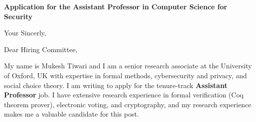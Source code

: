 \documentclass[11pt,a4paper,roman]{moderncv}
\begin{document}
\date{}
\opening{\textbf{Application for the Assistant Professor in Computer Science for Security}}
\closing{Your Sincerly, \vspace{-1em}}



\makelettertitle


Dear Hiring Committee, 
\\
\vspace{1em}

My name is Mukesh Tiwari and I am a senior research associate at 
the University of Oxford, UK with expertise in formal methods, cybersecurity and privacy, 
and social choice theory. I am writing to apply for the tenure-track \textbf{Assistant Professor} job. 
I have extensive research experience in
formal verification (Coq theorem prover), electronic voting, and cryptography, and my research 
experience makes me a valuable candidate for this post.
\end{document}
